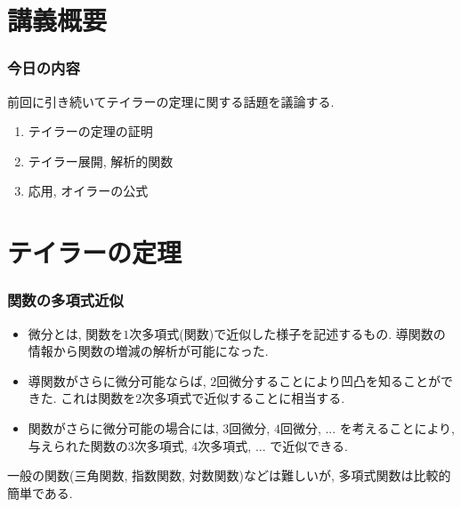 
\section{講義概要}


\begin{frame}
\frametitle{今日の内容}


前回に引き続いてテイラーの定理に関する話題を議論する. 
\begin{enumerate}
\item テイラーの定理の証明
\item テイラー展開, 解析的関数
\item 応用, オイラーの公式
\end{enumerate} 



\end{frame}







\section{テイラーの定理}

\begin{frame}
\frametitle{関数の多項式近似}


\begin{itemize}
\item 微分とは, 関数を$1$次多項式(関数)で近似した様子を記述するもの. 
導関数の情報から関数の増減の解析が可能になった. 
\item 導関数がさらに微分可能ならば, $2$回微分することにより凹凸を知ることができた. 
これは関数を$2$次多項式で近似することに相当する.
\item 関数がさらに微分可能の場合には, $3$回微分, $4$回微分, ... を考えることにより, 
与えられた関数の$3$次多項式, $4$次多項式, ... で近似できる. 
\end{itemize}
一般の関数(三角関数, 指数関数, 対数関数)などは難しいが, 多項式関数は比較的簡単である. 

\end{frame}




